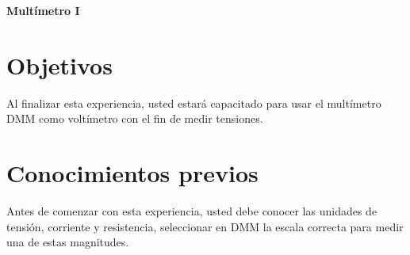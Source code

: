 \thispagestyle{fancy}
\begin{center}
	\LARGE{\textbf{Multímetro I}}
\end{center}
\section{Objetivos}
Al finalizar esta experiencia, usted estará capacitado para usar el multímetro DMM como voltímetro con el fin de medir tensiones.
\section{Conocimientos previos}
Antes de comenzar con esta experiencia, usted debe conocer las unidades de tensión, corriente y resistencia, seleccionar en DMM la escala correcta para medir una de estas magnitudes.